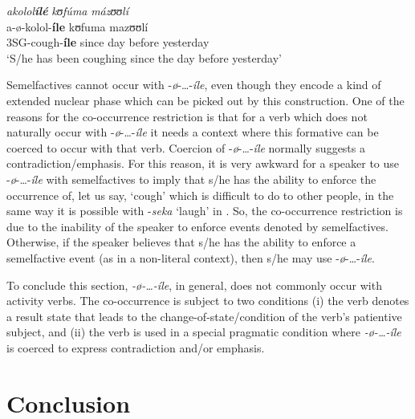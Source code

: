 \documentclass[output=paper,newtxmath,modfonts,nonflat,draftmode]{langsci/langscibook}
\begin{document}
\ex  \glll *\textit{akolol}\textbf{\textit{ílé} }         \textit{kʊ}\textit{fúma} \textit{mázʊʊ}\textit{lí}\\
      a-ø-kolol-\textbf{íle}    kʊfuma mazʊʊlí\\
      3SG-cough-\textbf{íle} since     day before yesterday\\
\glt ‘S/he has been coughing since the day before yesterday’
\z
\z


  Semelfactives cannot occur with -\textit{ø}-…-\textit{íle}, even though they encode a kind of extended nuclear phase which can be picked out by this construction. One of the reasons for the co-occurrence restriction is that for a verb which does not naturally occur with -\textit{ø}-…-\textit{íle} it needs a context where this formative can be coerced to occur with that verb. Coercion of -\textit{ø}-…-\textit{íle} normally suggests a contradiction/emphasis. For this reason, it is very awkward for a speaker to use -\textit{ø}-…-\textit{íle} with semelfactives to imply that s/he has the ability to enforce the occurrence of, let us say, ‘cough’ which is difficult to do to other people, in the same way it is possible with -\textit{seka} ‘laugh’ in . So, the co-occurrence restriction is due to the inability of the speaker to enforce events denoted by semelfactives. Otherwise, if the speaker believes that s/he has the ability to enforce a semelfactive event (as in a non-literal context), then s/he may use -\textit{ø}-…-\textit{íle}. 


To conclude this section, \textit{-ø}\textit{-…-íle}, in general, does not commonly occur with activity verbs. The co-occurrence is subject to two conditions (i) the verb denotes a result state that leads to the change-of-state/condition of the verb’s patientive subject, and (ii) the verb is used in a special pragmatic condition where \textit{-ø}\textit{-…-íle} is coerced to express contradiction and/or emphasis.

\section{Conclusion}

\label{sec:kanijo:5}
\end{document}
